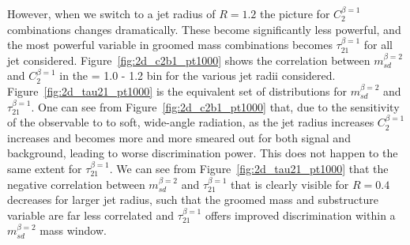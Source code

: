 However, when we switch to a jet radius of $R=1.2$ the picture for
$C_2^{\beta=1}$ combinations changes dramatically. These become
significantly less powerful, and the most powerful variable in groomed
mass combinations becomes $\tau_{21}^{\beta=1}$ for all jet
\pt considered. Figure~\ref{fig:2d_c2b1_pt1000} shows the correlation between
$m_{sd}^{\beta=2}$ and $C_2^{\beta=1}$ in the \pt = 1.0 - 1.2 \TeV bin for
the various jet radii considered. Figure~\ref{fig:2d_tau21_pt1000} is
the equivalent set of distributions for $m_{sd}^{\beta=2}$ and
$\tau_{21}^{\beta=1}$. One can see from
Figure~\ref{fig:2d_c2b1_pt1000} that, due to the sensitivity of the
observable to to soft, wide-angle radiation, as the jet radius increases
$C_2^{\beta=1}$ increases and becomes more and more smeared out for both signal and
background, leading to worse discrimination power. This does not
happen to the same extent for $\tau_{21}^{\beta=1}$. We can see from Figure~\ref{fig:2d_tau21_pt1000} that
the negative correlation between $m_{sd}^{\beta=2}$ and
$\tau_{21}^{\beta=1}$ that is clearly visible for $R=0.4$ decreases for
larger jet radius, such that the groomed mass and substructure variable
are far less correlated and $\tau_{21}^{\beta=1}$ offers improved
discrimination within a $m_{sd}^{\beta=2}$ mass window.



